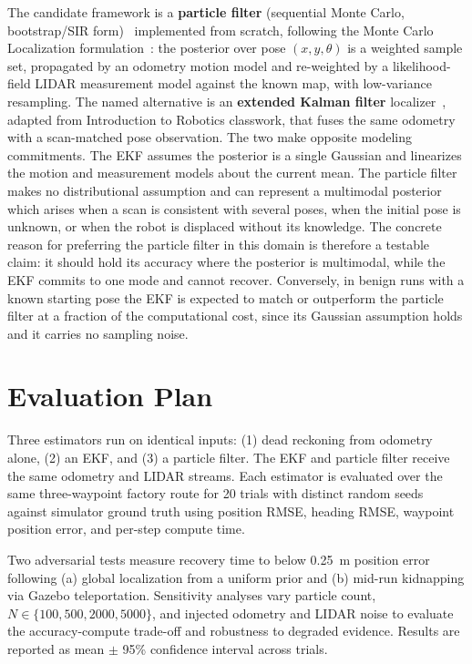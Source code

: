 \documentclass[11pt]{article}
\begin{document}
The candidate framework is a \textbf{particle filter} (sequential Monte Carlo, bootstrap/SIR form)~\cite{gordon1993novel, arulampalam2002tutorial} implemented from scratch, following the Monte Carlo Localization formulation~\cite{dellaert1999monte, fox1999monte, thrun2005probabilistic}: the posterior over pose $(x, y, \theta)$ is a weighted sample set, propagated by an odometry motion model and re-weighted by a likelihood-field LIDAR measurement model against the known map, with low-variance resampling.
The named alternative is an \textbf{extended Kalman filter} localizer~\cite{thrun2005probabilistic, moore2014generalized}, adapted from Introduction to Robotics classwork, that fuses the same odometry with a scan-matched pose observation.
The two make opposite modeling commitments.
The EKF assumes the posterior is a single Gaussian and linearizes the motion and measurement models about the current mean.
The particle filter makes no distributional assumption and can represent a multimodal posterior which arises when a scan is consistent with several poses, when the initial pose is unknown, or when the robot is displaced without its knowledge.
The concrete reason for preferring the particle filter in this domain is therefore a testable claim: it should hold its accuracy where the posterior is multimodal, while the EKF commits to one mode and cannot recover.
Conversely, in benign runs with a known starting pose the EKF is expected to match or outperform the particle filter at a fraction of the computational cost, since its Gaussian assumption holds and it carries no sampling noise.

\section{Evaluation Plan}

Three estimators run on identical inputs: (1) dead reckoning from odometry alone, (2) an EKF, and (3) a particle filter. The EKF and particle filter receive the same odometry and LIDAR streams. Each estimator is evaluated over the same three-waypoint factory route for 20 trials with distinct random seeds against simulator ground truth using position RMSE, heading RMSE, waypoint position error, and per-step compute time.

Two adversarial tests measure recovery time to below 0.25~m position error following (a) global localization from a uniform prior and (b) mid-run kidnapping via Gazebo teleportation. 
Sensitivity analyses vary particle count, $N \in \{100, 500, 2000, 5000\}$, and injected odometry and LIDAR noise to evaluate the accuracy-compute trade-off and robustness to degraded evidence. 
Results are reported as mean $\pm$ 95\% confidence interval across trials.
\end{document}
